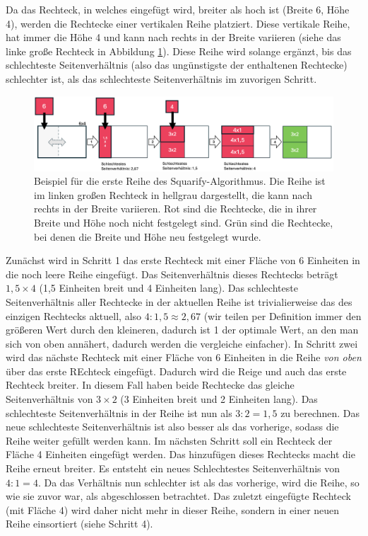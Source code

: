 Da das Rechteck, in welches eingefügt wird, breiter als hoch ist (Breite 6, Höhe 4), werden die Rechtecke einer vertikalen Reihe platziert. Diese vertikale Reihe, hat immer die Höhe 4 und kann nach rechts in der Breite variieren (siehe das linke große Rechteck in Abbildung \ref{fig:squarify_example_1}). Diese Reihe wird solange ergänzt, bis das schlechteste Seitenverhältnis (also das ungünstigste der enthaltenen Rechtecke) schlechter ist, als das schlechteste Seitenverhältnis im zuvorigen Schritt.

\begin{figure}
    \centering
    \includegraphics[width=1\textwidth]{images/squarify_example_1.png}
    \caption{Beispiel für die erste Reihe des Squarify-Algorithmus. Die Reihe ist im linken großen Rechteck in hellgrau dargestellt, die kann nach rechts in der Breite variieren. Rot sind die Rechtecke, die in ihrer Breite und Höhe noch nicht festgelegt sind. Grün sind die Rechtecke, bei denen die Breite und Höhe neu festgelegt wurde.}
    \label{fig:squarify_example_1}
\end{figure}

Zunächst wird in Schritt 1 das erste Rechteck mit einer Fläche von 6 Einheiten in die noch leere Reihe eingefügt. Das Seitenverhältnis dieses Rechtecks beträgt $1,5 \times 4$ (1,5 Einheiten breit und 4 Einheiten lang). Das schlechteste Seitenverhältnis aller Rechtecke in der aktuellen Reihe ist trivialierweise das des einzigen Rechtecks aktuell, also $4 : 1,5 \approx 2,67$ (wir teilen per Definition immer den größeren Wert durch den kleineren, dadurch ist 1 der optimale Wert, an den man sich von oben annähert, dadurch werden die vergleiche einfacher).
In Schritt zwei wird das nächste Rechteck mit einer Fläche von 6 Einheiten in die Reihe \textit{von oben} über das erste REchteck eingefügt. Dadurch wird die Reige und auch das erste Rechteck breiter. In diesem Fall haben beide Rechtecke das gleiche Seitenverhältnis von $3 \times 2$ (3 Einheiten breit und 2 Einheiten lang). Das schlechteste Seitenverhältnis in der Reihe ist nun als $3 : 2 = 1,5$ zu berechnen. Das neue schlechteste Seitenverhältnis ist also besser als das vorherige, sodass die Reihe weiter gefüllt werden kann.
Im nächsten Schritt soll ein Rechteck der Fläche 4 Einheiten eingefügt werden. Das hinzufügen dieses Rechtecks macht die Reihe erneut breiter. Es entsteht ein neues Schlechtestes Seitenverhältnis von $4 : 1 = 4$. Da das Verhältnis nun schlechter ist als das vorherige, wird die Reihe, so wie sie zuvor war, als abgeschlossen betrachtet. Das zuletzt eingefügte Rechteck (mit Fläche 4) wird daher nicht mehr in dieser Reihe, sondern in einer neuen Reihe einsortiert (siehe Schritt 4). 

